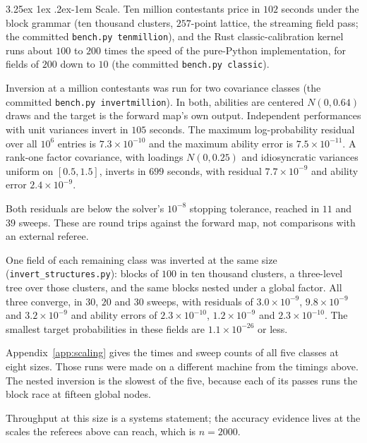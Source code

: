 \documentclass[11pt]{article}
\makeatletter
\renewcommand\paragraph{\@startsection{paragraph}{4}{\z@}%
  {3.25ex \@plus1ex \@minus.2ex}{-1em}%
  {\normalfont\normalsize\itshape}}
\makeatother
\begin{document}
\paragraph{Scale.} Ten million contestants price in $102$ seconds under the
block grammar (ten thousand clusters, $257$-point lattice, the streaming
field pass; the committed \texttt{bench.py tenmillion}), and the Rust
classic-calibration kernel runs about $100$ to $200$ times the speed of
the pure-Python implementation, for fields of $200$ down to $10$ (the
committed \texttt{bench.py classic}).

Inversion at a million contestants was run for two covariance classes
(the committed \texttt{bench.py invertmillion}). In both, abilities are
centered $N(0,0.64)$ draws and the target is the forward map's own
output. Independent performances with unit variances invert in $105$
seconds. The maximum log-probability residual over all $10^{6}$ entries
is $7.3\times10^{-10}$ and the maximum ability error is
$7.5\times10^{-11}$. A rank-one factor covariance, with loadings
$N(0,0.25)$ and idiosyncratic variances uniform on $[0.5,1.5]$, inverts
in $699$ seconds, with residual $7.7\times10^{-9}$ and ability error
$2.4\times10^{-9}$.

Both residuals are below the solver's $10^{-8}$ stopping tolerance, reached
in $11$ and $39$ sweeps. These are round trips against the forward
map, not comparisons with an external referee.

One field of each remaining class was inverted at the same size
(\texttt{invert\_structures.py}): blocks of $100$ in ten thousand
clusters, a three-level tree over those clusters, and the same blocks
nested under a global factor. All three converge, in $30$, $20$ and $30$
sweeps, with residuals of $3.0\times10^{-9}$, $9.8\times10^{-9}$ and
$3.2\times10^{-9}$ and ability errors of $2.3\times10^{-10}$,
$1.2\times10^{-9}$ and $2.3\times10^{-10}$. The smallest target
probabilities in these fields are $1.1\times10^{-26}$ or less.

Appendix~\ref{app:scaling} gives the times and sweep counts of all five
classes at eight sizes. Those runs were made on a different machine from
the timings above. The nested inversion is the slowest of the five,
because each of its passes runs the block race at fifteen global nodes.

Throughput at this size is a systems statement; the accuracy
evidence lives at the scales the referees above can reach, which is
$n=2000$.
\end{document}
